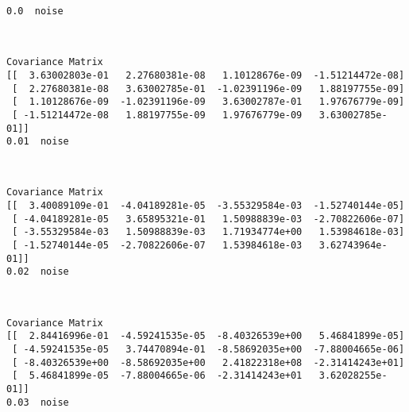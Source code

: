 \documentclass{article}
\begin{document}
    \begin{Verbatim}[commandchars=\\\{\}]
0.0  noise
    \end{Verbatim}

    \begin{center}
    \end{center}
    { \hspace*{\fill} \\}
    
    \begin{Verbatim}[commandchars=\\\{\}]
Covariance Matrix
[[  3.63002803e-01   2.27680381e-08   1.10128676e-09  -1.51214472e-08]
 [  2.27680381e-08   3.63002785e-01  -1.02391196e-09   1.88197755e-09]
 [  1.10128676e-09  -1.02391196e-09   3.63002787e-01   1.97676779e-09]
 [ -1.51214472e-08   1.88197755e-09   1.97676779e-09   3.63002785e-01]]
0.01  noise
    \end{Verbatim}

    \begin{center}
    \end{center}
    { \hspace*{\fill} \\}
    
    \begin{Verbatim}[commandchars=\\\{\}]
Covariance Matrix
[[  3.40089109e-01  -4.04189281e-05  -3.55329584e-03  -1.52740144e-05]
 [ -4.04189281e-05   3.65895321e-01   1.50988839e-03  -2.70822606e-07]
 [ -3.55329584e-03   1.50988839e-03   1.71934774e+00   1.53984618e-03]
 [ -1.52740144e-05  -2.70822606e-07   1.53984618e-03   3.62743964e-01]]
0.02  noise
    \end{Verbatim}

    \begin{center}
    \end{center}
    { \hspace*{\fill} \\}
    
    \begin{Verbatim}[commandchars=\\\{\}]
Covariance Matrix
[[  2.84416996e-01  -4.59241535e-05  -8.40326539e+00   5.46841899e-05]
 [ -4.59241535e-05   3.74470894e-01  -8.58692035e+00  -7.88004665e-06]
 [ -8.40326539e+00  -8.58692035e+00   2.41822318e+08  -2.31414243e+01]
 [  5.46841899e-05  -7.88004665e-06  -2.31414243e+01   3.62028255e-01]]
0.03  noise
    \end{Verbatim}
\end{document}
